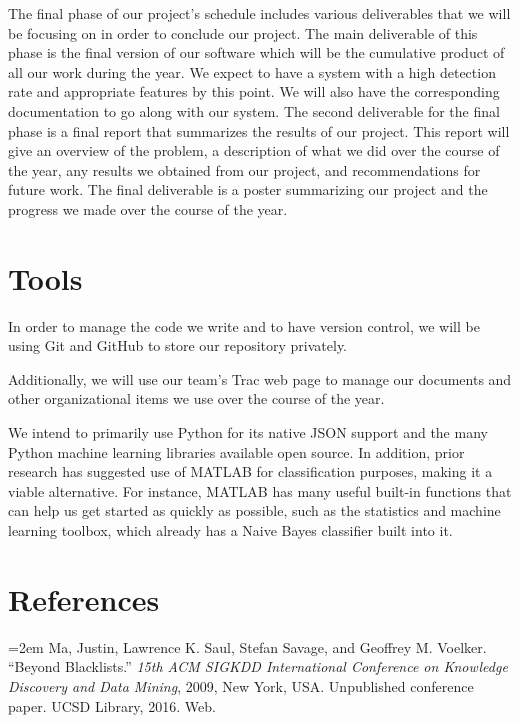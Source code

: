 \documentclass[cs,proposal]{hmcclinic}
\begin{document}
The final phase of our project's schedule includes various deliverables that we will be focusing on in order to conclude our project. The main deliverable of this phase is the final version of our software which will be the cumulative product of all our work during the year. We expect to have a system with a high detection rate and appropriate features by this point. We will also have the corresponding documentation to go along with our system. The second deliverable for the final phase is a  final report that summarizes the results of our project. This report will give an overview of the problem, a description of what we did over the course of the year, any results we obtained from our project, and recommendations for future work. The final deliverable is a poster summarizing our project and the progress we made over the course of the year.


\section{Tools}

In order to manage the code we write and to have version control, we will be using Git and GitHub to store our repository privately.

Additionally, we will use our team's Trac web page to manage our documents and other organizational items we use over the course of the year.

We intend to primarily use Python for its native JSON support and the many Python machine learning libraries available open source. In addition, prior research has suggested use of MATLAB for classification purposes, making it a viable alternative. For instance, MATLAB has many useful built-in functions that can help us get started as quickly as possible, such as the statistics and machine learning toolbox, which already has a Naive Bayes classifier built into it.


\section{References}

\hangindent=2em
Ma, Justin, Lawrence K. Saul, Stefan Savage, and Geoffrey M. Voelker. ``Beyond Blacklists.'' \textit{15th ACM SIGKDD International Conference on Knowledge Discovery and Data Mining}, 2009, New York, USA. Unpublished conference paper. UCSD Library, 2016. Web.
\end{document}
